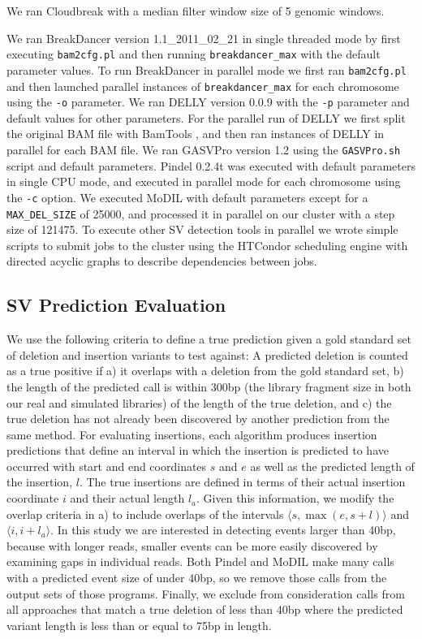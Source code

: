 \documentclass[11pt]{article}
\begin{document}
We ran Cloudbreak with a median filter window size of 5 genomic windows.

We ran BreakDancer version 1.1\_2011\_02\_21 in single threaded mode by first executing \texttt{bam2cfg.pl} and then running \texttt{breakdancer\_max} with the default parameter values.  To run BreakDancer in parallel mode we first ran \texttt{bam2cfg.pl} and then launched parallel instances of \texttt{breakdancer\_max} for each chromosome using the \texttt{-o} parameter. We ran DELLY version 0.0.9 with the \texttt{-p} parameter and default values for other parameters. For the parallel run of DELLY we first split the original BAM file with BamTools \citep{Barnett:2011hm}, and then ran instances of DELLY in parallel for each BAM file. We ran GASVPro version 1.2 using the \texttt{GASVPro.sh} script and default parameters. Pindel 0.2.4t was executed with default parameters in single CPU mode, and executed in parallel mode for each chromosome using the \texttt{-c} option. We executed MoDIL with default parameters except for a \texttt{MAX\_DEL\_SIZE} of 25000, and processed it in parallel on our cluster with a step size of 121475. To execute other SV detection tools in parallel we wrote simple scripts to submit jobs to the cluster using the HTCondor scheduling engine \citep{condor-practice} with directed acyclic graphs to describe dependencies between jobs. 

\subsection{SV Prediction Evaluation}

We use the following criteria to define a true prediction given a gold standard set of deletion and insertion variants to test against: A predicted deletion is counted as a true positive if a) it overlaps with a deletion from the gold standard set, b) the length of the predicted call is within 300bp (the library fragment size in both our real and simulated libraries) of the length of the true deletion, and c) the true deletion has not already been discovered by another prediction from the same method. For evaluating insertions, each algorithm produces insertion predictions that define an interval in which the insertion is predicted to have occurred with start and end coordinates $s$ and $e$ as well as the predicted length of the insertion, $l$. The true insertions are defined in terms of their actual insertion coordinate $i$ and their actual length $l_a$. Given this information, we modify the overlap criteria in a) to include overlaps of the intervals $\langle s,\max{\left(e,s+l\right)} \rangle$ and $\langle i,i+l_a \rangle$. In this study we are interested in detecting events larger than 40bp, because with longer reads, smaller events can be more easily discovered by examining gaps in individual reads. Both Pindel and MoDIL make many calls with a predicted event size of under 40bp, so we remove those calls from the output sets of those programs. Finally, we exclude from consideration calls from all approaches that match a true deletion of less than 40bp where the predicted variant length is less than or equal to 75bp in length.
\end{document}
